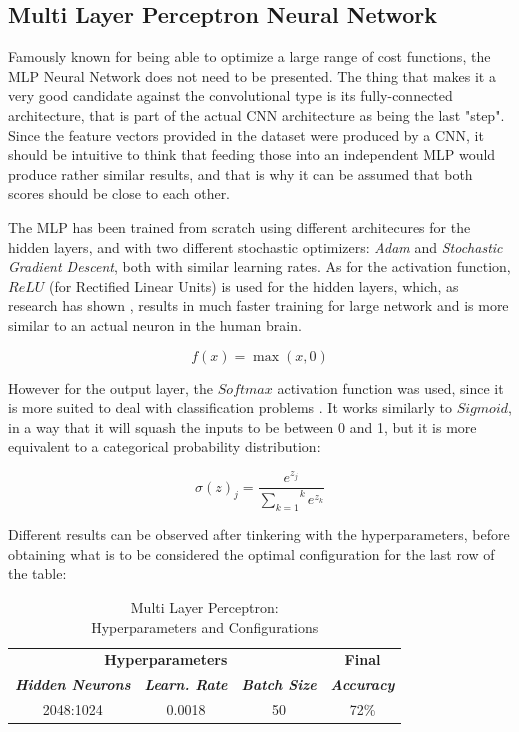 \documentclass[conference]{IEEEtran}
\begin{document}
\subsection{Multi Layer Perceptron Neural Network}
    Famously known for being able to optimize a large range of cost functions, the MLP Neural Network does not need to be presented. The thing that makes it a very good candidate against the convolutional type is its fully-connected architecture, that is part of the actual CNN architecture as being the last "step".
Since the feature vectors provided in the dataset were produced by a CNN, it should be intuitive to think that feeding those into an independent MLP would produce rather similar results, and that is why it can be assumed that both scores should be close to each other.

The MLP has been trained from scratch using different architecures for the hidden layers, and with two different stochastic optimizers: \emph{Adam} and \emph{Stochastic Gradient Descent}, both with similar learning rates.
As for the activation function, $ReLU$ (for Rectified Linear Units) is used for the hidden layers, which, as research has shown \cite{b1}, results in much faster training for large network and is more similar to an actual neuron in the human brain.

\begin{equation}
    f(x) = \max(x, 0)
\end{equation}

However for the output layer, the $Softmax$ activation function was used, since it is more suited to deal with classification problems \cite{b2}. It works similarly to $Sigmoid$, in a way that it will squash the inputs to be between 0 and 1, but it is more equivalent to a categorical probability distribution:

\begin{equation}
    \sigma(z)_j = \frac{e^{z_j}}{{\sum\limits_{k=1}}^k e^{z_k}}
\end{equation}

Different results can be observed after tinkering with the hyperparameters, before obtaining what is to be considered the optimal configuration for the last row of the table:

\begin{table}[htbp]
\caption{Multi Layer Perceptron: \\ Hyperparameters and Configurations}
\begin{center}
\begin{tabular}{|c|c|c|c|}
\hline
\multicolumn{3}{|c|}{\textbf{Hyperparameters}}&\textbf{Final} \\
\cline{1-3} 
\textbf{\textit{Hidden Neurons}}& \textbf{\textit{Learn. Rate}}& \textbf{\textit{Batch Size}} & \textbf{\textit{Accuracy}} \\
\hline
2048:1024& 0.0018 & 50 & 72\% \\
\hline
\end{tabular}
\label{tab1}
\end{center}
\end{table}
\end{document}
